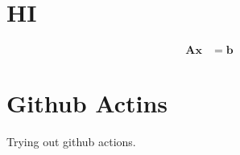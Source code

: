 \documentclass{article}
\begin{document}
\section{HI}
\begin{align}
 \mathbf{A}\mathbf{x} &= \mathbf{b}
\end{align}

\section{Github Actins}
Trying out github actions.
\end{document}
